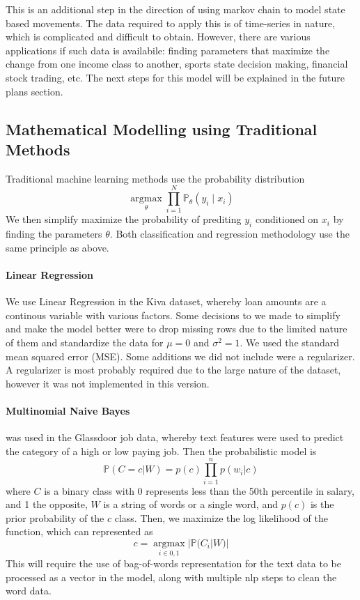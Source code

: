 \documentclass{article}
\begin{document}
This is an additional step in the direction of using markov chain to model state based movements. The data required to apply this is of time-series in nature, which is complicated and difficult to obtain. However, there are various applications if such data is availabile: finding parameters that maximize the change from one income class to another, sports state decision making, financial stock trading, etc. The next steps for this model will be explained in the future plans section.

\subsection{Mathematical Modelling using Traditional Methods}
Traditional machine learning methods use the probability distribution 
$$\underset{\theta}{\operatorname{argmax}} \prod_{i=1}^N \mathbb{P}_\theta(y_i \mid x_i)$$
We then simplify maximize the probability of prediting $y_i$ conditioned on $x_i$ by finding the parameters $\theta$. Both classification and regression methodology use the same principle as above. 

\paragraph{Linear Regression}
We use Linear Regression in the Kiva dataset, whereby loan amounts are a continous variable with various factors. Some decisions to we made to simplify and make the model better were to drop missing rows due to the limited nature of them and standardize the data for $\mu = 0$ and $\sigma^2 = 1$. We used the standard mean squared error (MSE). Some additions we did not include were a regularizer. A regularizer is most probably required due to the large nature of the dataset, however it was not implemented in this version. 

\paragraph{Multinomial Naive Bayes} was used in the Glassdoor job data, whereby text features were used to predict the category of a high or low paying job. Then the probabilistic model is
$$\mathbb{P}(C = c | W) = p(c) \prod_{i=1}^{n}p(w_i | c)$$
where $C$ is a binary class with 0 represents less than the 50th percentile in salary, and 1 the opposite, $W$ is a string of words or a single word, and $p(c)$ is the prior probability of the $c$ class. Then, we maximize the log likelihood of the function, which can represented as
$$c = \underset{i \in {0,1}}{\operatorname{argmax}} |\mathbb{P}(C_i | W)|$$
This will require the use of bag-of-words representation for the text data to be processed as a vector in the model, along with multiple nlp steps to clean the word data. 
\end{document}
